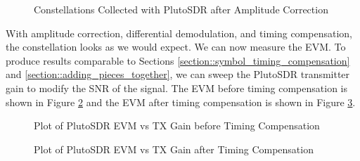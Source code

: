 \documentclass{article}
\begin{document}
\begin{figure}[H]
	\centerline{}
	\caption{Constellations Collected with PlutoSDR after Amplitude Correction}
	\label{fig::pluto_constellations_dbpsk_amp_comp}
\end{figure}

\noindent With amplitude correction, differential demodulation, and timing compensation, the constellation looks as we would expect. We can now measure the EVM. To produce results comparable to Sections \ref{section::symbol_timing_compensation} and \ref{section::adding_pieces_together}, we can sweep the PlutoSDR transmitter gain to modify the SNR of the signal. The EVM before timing compensation is shown in Figure \ref{fig::pluto_evm_no_comp} and the EVM after timing compensation is shown in Figure \ref{fig::pluto_evm}.

\begin{figure}[H]
	\centerline{}
	\caption{Plot of PlutoSDR EVM vs TX Gain before Timing Compensation}
	\label{fig::pluto_evm_no_comp}
\end{figure}

\begin{figure}[H]
	\centerline{}
	\caption{Plot of PlutoSDR EVM vs TX Gain after Timing Compensation}
	\label{fig::pluto_evm}
\end{figure}
\end{document}
